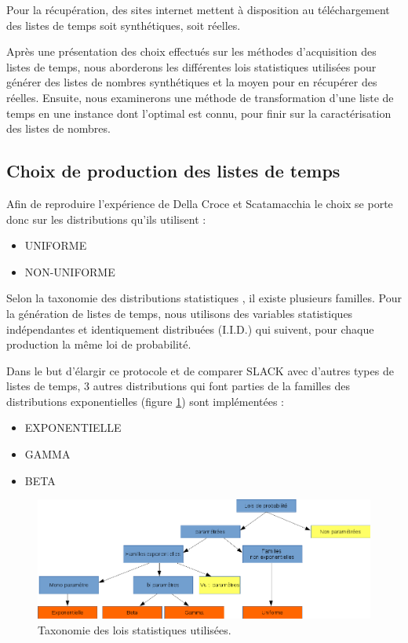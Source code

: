 \documentclass[a4paper,12pt]{report}
\theoremstyle{plain}				%
\theoremstyle{definition}				%
\newcommand\dcs{Della Croce et Scatamacchia\xspace}
\begin{document}
Pour la récupération, des sites internet mettent à disposition au téléchargement des listes de temps soit synthétiques, soit réelles. 
  
\bigskip
Après une présentation des choix effectués sur les méthodes d'acquisition des listes de temps, 
nous aborderons les différentes lois statistiques utilisées pour générer des listes de nombres synthétiques 
et la moyen  pour en récupérer des réelles. Ensuite, nous examinerons une méthode de transformation d'une liste de temps en une instance dont l'optimal est connu, pour finir sur la caractérisation des listes de nombres.  


\subsection{Choix de production des listes de temps}\label{ssec:instancesChoixProduction}

Afin de reproduire l'expérience de \dcs le choix se porte donc sur les distributions qu'ils utilisent :
\begin{itemize}
	\item UNIFORME
	\item NON-UNIFORME
\end{itemize}

Selon la taxonomie des distributions statistiques \cite{nielsen2009statistical}, il existe plusieurs familles. 
Pour la génération de listes de temps, nous utilisons des variables statistiques indépendantes et 
  identiquement distribuées (I.I.D.) qui suivent, pour chaque production la même loi de probabilité.

Dans le but d'élargir ce protocole et de comparer SLACK avec d'autres types de listes de temps, 3 autres distributions qui font parties de la familles des distributions exponentielles 
(figure \ref{fig:taxonomieLoisStatistiques}) sont implémentées :
\begin{itemize}
	\item EXPONENTIELLE
	\item GAMMA
	\item BETA
\end{itemize}

\begin{figure}
{\centering
\includegraphics[width=\columnwidth]{taxonomieLoisStatistiques.png}
\caption{Taxonomie des lois statistiques utilisées.}
\label{fig:taxonomieLoisStatistiques}
\par}
\end{figure}
\end{document}
